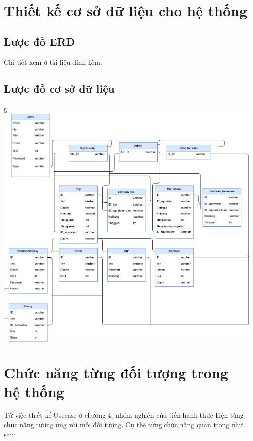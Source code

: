


\section{Thiết kế cơ sở dữ liệu cho hệ thống}
\subsection{Lược đồ ERD}

Chi tiết xem ở tài liệu đính kèm.

\subsection{Lược đồ cơ sở dữ liệu}
\begin{center}
  \captionsetup{type=figure}
g  \includegraphics[width=\linewidth]{image/classDiagram.png}
\end{center}
\section{Chức năng từng đối tượng trong hệ thống}
Từ việc thiết kế Usecase ở chương 4, nhóm nghiên cứu tiến hành thực hiện từng chức năng tương ứng với mỗi đối tượng. Cụ thể từng chức năng quan trọng như sau:

